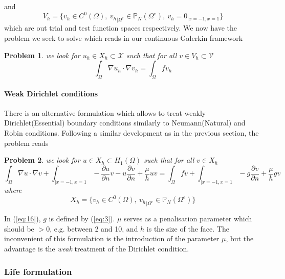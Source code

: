 \documentclass[a4paper]{book}
\newtheorem{problem}{Problem}
\begin{document}
and
\begin{equation}
  \label{eq:18}
  V_h = \Big\{ v_h \in C^0(\Omega),\ {v_h}_{|\Omega^e} \in \mathbb{P}_N( \Omega^e ),\   v_h=0_{|x=-1,x=1}\Big\}
\end{equation}
which are out trial and test function spaces respectively.  We now
have the problem we seek to solve which reads in our continuous
Galerkin framework
\begin{problem}
  \label{prob:2}
  we look for $u_h \in X_h \subset \mathcal{X}$ such that for all $v
  \in V_h \subset \mathcal{V}$
  \begin{equation}
    \label{eq:20}
    \int_\Omega \nabla u_h \cdot \nabla v_h  = \int_\Omega f v_h
  \end{equation}
\end{problem}

\paragraph{Weak Dirichlet conditions}
\label{sec:weak-dirichl-cond}

There is an alternative formulation which allows to treat weakly
Dirichlet(Essential) boundary conditions similarly to Neumann(Natural)
and Robin conditions. Following a similar development as in the previous section, the problem reads
\begin{problem}
  \label{prob:3}
  we look for $u \in X_h \subset H_1(\Omega)$ such that for all $v \in
  X_h$
\begin{equation}
  \label{eq:16}
  \int_\Omega \nabla u \cdot \nabla v +
  \int_{|x=-1,x=1} -\frac{\partial u}{\partial n} v - u \frac{\partial v}{\partial n} + \frac{\mu}{h} u v
  =
  \int_\Omega f v +
  \int_{|x=-1,x=1}  - g \frac{\partial v}{\partial n} + \frac{\mu}{h} g v
\end{equation}
where
\begin{equation}
  \label{eq:19}
  X_h = \Big\{ v_h \in C^0(\Omega),\ {v_h}_{|\Omega^e} \in \mathbb{P}_N( \Omega^e ) \Big\}
\end{equation}
\end{problem}
In (\ref{eq:16}), $g$ is defined by (\ref{eq:3}). $\mu$ serves as a penalisation
parameter which should be $> 0$, e.g. between 2 and 10, and $h$ is the
size of the face. The inconvenient of this formulation is the
introduction of the parameter $\mu$, but the advantage is the
\emph{weak} treatment of the Dirichlet condition.

\subsubsection{Life formulation}
\label{sec:life-formulation-1}
\end{document}
